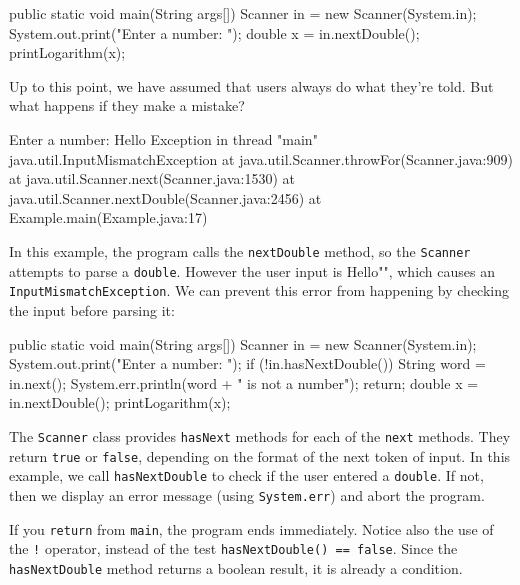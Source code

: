 \documentclass[12pt]{book}
\theoremstyle{exercise}
\newcommand{\java}[1]{\verb"#1"}
\newcommand{\java}[1]{\lstinline{#1}} %
\begin{document}
\begin{code}
    public static void main(String args[]) {
        Scanner in = new Scanner(System.in);
        System.out.print("Enter a number: ");
        double x = in.nextDouble();
        printLogarithm(x);
    }
\end{code}

Up to this point, we have assumed that users always do what they're told.
But what happens if they make a mistake?


\begin{stdout}
Enter a number: Hello
Exception in thread "main" java.util.InputMismatchException
    at java.util.Scanner.throwFor(Scanner.java:909)
    at java.util.Scanner.next(Scanner.java:1530)
    at java.util.Scanner.nextDouble(Scanner.java:2456)
    at Example.main(Example.java:17)
\end{stdout}


In this example, the program calls the \java{nextDouble} method, so the \java{Scanner} attempts to parse a \java{double}.
However the user input is \java{"Hello"}, which causes an \java{InputMismatchException}.
We can prevent this error from happening by checking the input before parsing it:

\begin{code}
    public static void main(String args[]) {
        Scanner in = new Scanner(System.in);
        System.out.print("Enter a number: ");
        if (!in.hasNextDouble()) {
            String word = in.next();
            System.err.println(word + " is not a number");
            return;
        }
        double x = in.nextDouble();
        printLogarithm(x);
    }
\end{code}

The \java{Scanner} class provides \java{hasNext} methods for each of the \java{next} methods.
They return \java{true} or \java{false}, depending on the format of the next token of input.
In this example, we call \java{hasNextDouble} to check if the user entered a \java{double}.
If not, then we display an error message (using \java{System.err}) and abort the program.

If you \java{return} from \java{main}, the program ends immediately.
Notice also the use of the \java{!} operator, instead of the test \java{hasNextDouble() == false}.
Since the \java{hasNextDouble} method returns a boolean result, it is already a condition.
\end{document}
